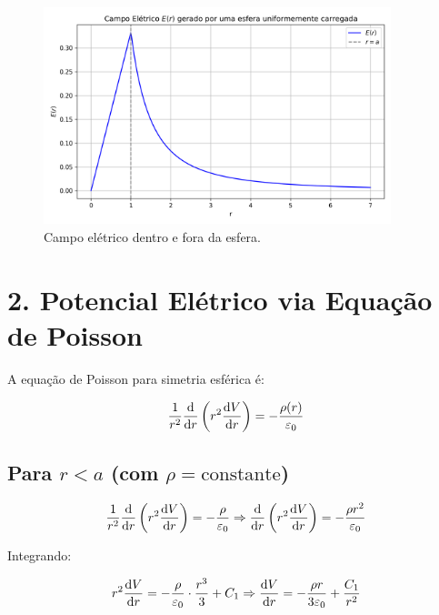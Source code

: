 \documentclass[a4paper,12pt]{article}
\begin{document}
\begin{flushleft}
\begin{figure}[h]
\centering
\includegraphics[width=0.9\textwidth]{plots/campo_eletrico_esfera.png} %
\caption{Campo elétrico dentro e fora da esfera.}
\end{figure}

\newpage
\section*{2. Potencial Elétrico via Equação de Poisson}

A \colorbox{green!15}{equação de Poisson para simetria esférica é:}

\begin{equation}
\frac{1}{r^2} \dv{r} \left( r^2 \dv{V}{r} \right) = -\frac{\rho(r)}{\varepsilon_0}
\end{equation}

\subsection*{\colorbox{green!15}{Para \( r < a \) (com \( \rho = \text{constante} \))}}

\begin{equation}
\frac{1}{r^2} \dv{r} \left( r^2 \dv{V}{r} \right) = -\frac{\rho}{\varepsilon_0}
\Rightarrow \dv{r} \left( r^2 \dv{V}{r} \right) = -\frac{\rho r^2}{\varepsilon_0}
\end{equation}

Integrando:

\begin{equation}
r^2 \dv{V}{r} = -\frac{\rho}{\varepsilon_0} \cdot \frac{r^3}{3} + C_1
\Rightarrow \dv{V}{r} = -\frac{\rho r}{3\varepsilon_0} + \frac{C_1}{r^2}
\end{equation}


\end{flushleft}
\end{document}
